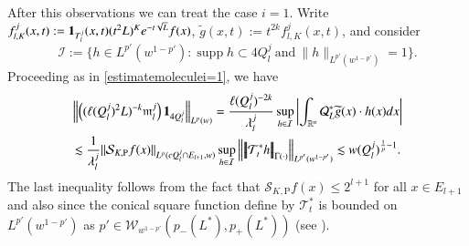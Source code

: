 \documentclass[11pt, a4paper,leqno]{amsart}
\newcommand{\mm}{\mathfrak{m}}
\renewcommand{\chi}{{\bf 1}}
\theoremstyle{plain}
\theoremstyle{definition}
\theoremstyle{remark}
\numberwithin{equation}{section}
\def \R{ \mathbb{R} }
\def \Scal{ \mathcal{S} }
\def \pp{ \mathrm{P} }
\DeclareMathOperator{\supp}{supp}
\begin{document}
After this observations we can treat the case $i=1$. Write $f_{l,K}^j(x,t):=\chi_{T_l^j}(x,t)(t^2L)^Ke^{-t\sqrt{L}}f(x)$, $\widetilde{g}(x,t):=t^{2k}f_{l,K}^j(x,t)$, and consider
$$
\mathcal{I}:=\big\{h\in L^{p'}(w^{1-p'}) : \supp h\subset 4Q_l^j \ \textrm{and} \ \|h\|_{L^{p'}(w^{1-p'})}=1\big\}.
$$
Proceeding as in \eqref{estimatemoleculei=1}, we have 
\begin{multline*}
\left\|\left((\ell(Q_l^j)^2L)^{-k}\mm_l^j\right)\chi_{4Q_l^j}
    \right\|_{L^p(w)} 
 =
\frac{\ell(Q_l^j)^{-2k}}{\lambda^{j}_l}
\sup_{h\in\mathcal{I}}\left|\int_{\R^n}\mathcal{Q}_L^*\widetilde{g}(x)\cdot h(x)dx\right|
\\
    \lesssim
    \frac{1}{\lambda_l^j} 
    \| \Scal_{K,\pp}f(x)\|_{L^p(cQ_l^j\cap E_{l+1},w)}
		\sup_{h\in \mathcal{I}}\left\|\left|\!\left|\!\left|
\mathcal{T}_t^*h\right|\!\right|\!\right|_{\Gamma(\cdot)}\right\|_{L^{p'}(w^{1-p'})}
    \lesssim w(Q_l^j)^{\frac{1}{p}-1}.
    \end{multline*}
The last inequality follows from the fact that $\Scal_{K,\pp}f(x)\leq 2^{l+1}$ for all $x\in E_{l+1}$ and also since the conical square function define by $\mathcal{T}_t^*$ is bounded on $L^{p'}(w^{1-p'})$ as $p'\in \mathcal{W}_{w^{1-p'}}(p_-(L^*),p_+(L^*))$ (see \cite{MartellPrisuelos}).
\end{document}
